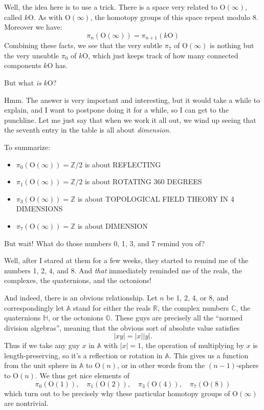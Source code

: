 \documentclass{article}
\def\tightlist{}
\begin{document}
Well, the idea here is to use a trick. There is a space very related to
\(\mathrm{O}(\infty)\), called \(k\mathrm{O}\). As with
\(\mathrm{O}(\infty)\), the homotopy groups of this space repeat modulo
8. Moreover we have:
\[\pi_n(\mathrm{O}(\infty)) = \pi_{n+1}(k\mathrm{O})\] Combining these
facts, we see that the very subtle \(\pi_7\) of \(\mathrm{O}(\infty)\)
is nothing but the very unsubtle \(\pi_0\) of \(k\mathrm{O}\), which
just keeps track of how many connected components \(k\mathrm{O}\) has.

But what \emph{is} \(k\mathrm{O}\)?

Hmm. The answer is very important and interesting, but it would take a
while to explain, and I want to postpone doing it for a while, so I can
get to the punchline. Let me just say that when we work it all out, we
wind up seeing that the seventh entry in the table is all about
\emph{dimension}.

To summarize:

\begin{itemize}
\tightlist
\item
  \(\pi_0(\mathrm{O}(\infty)) = \mathbb{Z}/2\) is about REFLECTING
\item
  \(\pi_1(\mathrm{O}(\infty)) = \mathbb{Z}/2\) is about ROTATING 360
  DEGREES
\item
  \(\pi_3(\mathrm{O}(\infty)) = \mathbb{Z}\) is about TOPOLOGICAL FIELD
  THEORY IN 4 DIMENSIONS
\item
  \(\pi_7(\mathrm{O}(\infty)) = \mathbb{Z}\) is about DIMENSION
\end{itemize}

But wait! What do those numbers 0, 1, 3, and 7 remind you of?

Well, after I stared at them for a few weeks, they started to remind me
of the numbers 1, 2, 4, and 8. And \emph{that} immediately reminded me
of the reals, the complexes, the quaternions, and the octonions!

And indeed, there is an obvious relationship. Let \(n\) be 1, 2, 4, or
8, and correspondingly let \(\mathbb{A}\) stand for either the reals
\(\mathbb{R}\), the complex numbers \(\mathbb{C}\), the quaternions
\(\mathbb{H}\), or the octonions \(\mathbb{O}\). These guys are
precisely all the ``normed division algebras'', meaning that the obvious
sort of absolute value satisfies \[|xy| = |x||y|.\] Thus if we take any
guy \(x\) in \(\mathbb{A}\) with \(|x| = 1\), the operation of
multiplying by \(x\) is length-preserving, so it's a reflection or
rotation in \(\mathbb{A}\). This gives us a function from the unit
sphere in \(\mathbb{A}\) to \(\mathrm{O}(n)\), or in other words from
the \((n-1)\)-sphere to \(\mathrm{O}(n)\). We thus get nice elements of
\[\pi_0(\mathrm{O}(1)), \quad\pi_1(\mathrm{O}(2)), \quad\pi_3(\mathrm{O}(4)), \quad\pi_7(\mathrm{O}(8))
\] which turn out to be precisely why these particular homotopy groups
of \(\mathrm{O}(\infty)\) are nontrivial.
\end{document}
